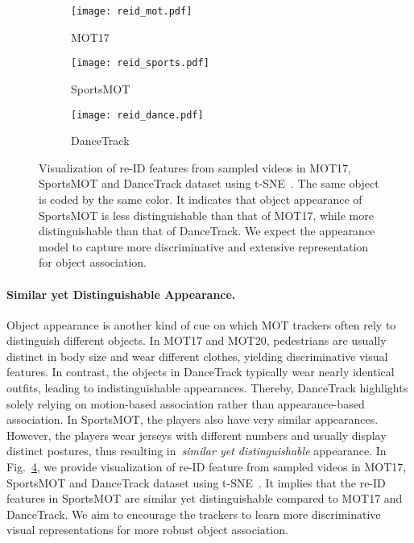 \documentclass[10pt,twocolumn,letterpaper]{article}
\begin{document}
\begin{figure}[pt]
	\centering
	\begin{subfigure}{0.32\linewidth}
		\centering
		\texttt{[image: reid\_mot.pdf]}
		\caption{MOT17}
		\label{reid:mot17}
	\end{subfigure}
 \begin{subfigure}{0.32\linewidth}
        \centering
        \texttt{[image: reid\_sports.pdf]}
        \caption{SportsMOT}
        \label{reid:sports}
    \end{subfigure}
	\begin{subfigure}{0.32\linewidth}
		\centering
		\texttt{[image: reid\_dance.pdf]}
		\caption{DanceTrack}
		\label{reid:dancetrack}
	\end{subfigure}
\vspace{-2mm}
\caption{Visualization of re-ID features from sampled videos
in MOT17, SportsMOT and DanceTrack dataset using t-SNE~\cite{van2008visualizing}.
The same object is coded by the same color. It indicates that object appearance of SportsMOT is less distinguishable than that of MOT17, while more distinguishable than that of DanceTrack. We expect the appearance model to capture more discriminative and extensive representation for object association.
}
\vspace{-5mm}
\label{fig:reid}
\end{figure}

\vspace{-4mm}
\paragraph{Similar yet Distinguishable Appearance.}
Object appearance is another kind of cue on which MOT trackers often rely to distinguish different objects.
In MOT17 and MOT20, pedestrians are usually distinct in body size and wear different clothes, yielding discriminative visual features.
In contrast, the objects in DanceTrack typically wear nearly identical outfits, leading to indistinguishable appearances.
Thereby, DanceTrack highlights solely relying on motion-based association rather than appearance-based association.
In SportsMOT, the players also have very similar appearances.
However, the players wear jerseys with different numbers and usually display distinct postures, thus resulting in~\emph{similar yet distinguishable} appearance.
In Fig.~\ref{fig:reid}, we provide visualization of re-ID feature from sampled videos in MOT17, SportsMOT and DanceTrack dataset using t-SNE~\cite{van2008visualizing}. 
It implies that the re-ID features in SportsMOT are similar yet distinguishable compared to MOT17 and DanceTrack. 
We aim to encourage the trackers to learn more discriminative visual representations for more robust object association.
\end{document}
